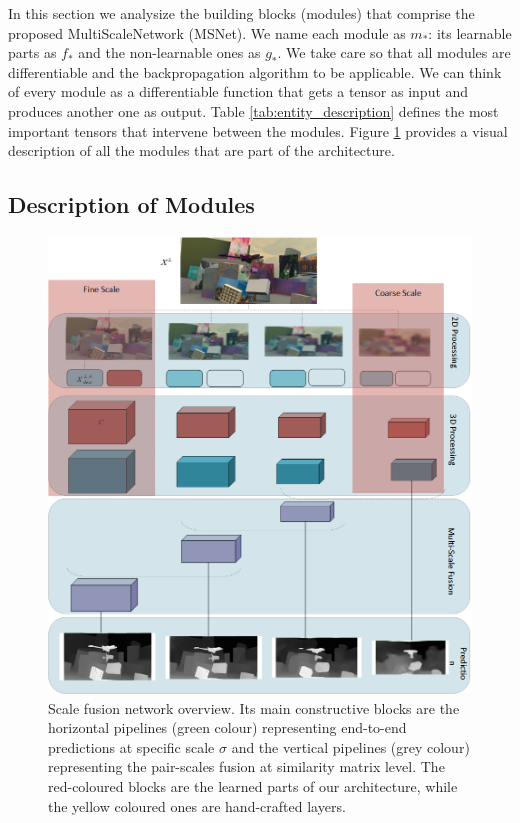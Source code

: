 \documentclass[runningheads]{llncs}
\begin{document}
In this section we analysize the building blocks (modules) that comprise the proposed MultiScaleNetwork (MSNet). We name each module as $m_*$: its learnable parts as $f_*$ and the non-learnable ones as $g_*$. We take care so that all modules are differentiable and the backpropagation algorithm to be applicable. We can think of every module as a differentiable function that gets a tensor as input and produces another one as output. Table \ref{tab:entity_description} defines the most important tensors that intervene between the modules. Figure \ref{fig:cnn_architecture} provides a visual description of all the modules that are part of the architecture.

\subsection{Description of Modules}
\begin{figure}[!htbp]
    \centering
    \includegraphics[scale=0.5]{figures/stereo_architecture.png}
    \caption{Scale fusion network overview. Its main constructive blocks are the horizontal pipelines (green colour) representing end-to-end predictions at specific scale $\sigma$ and the vertical pipelines (grey colour) representing the pair-scales fusion at similarity matrix level. The red-coloured blocks are the learned parts of our architecture, while the yellow coloured ones are hand-crafted layers.}
    \label{fig:cnn_architecture}
\end{figure}
\end{document}
